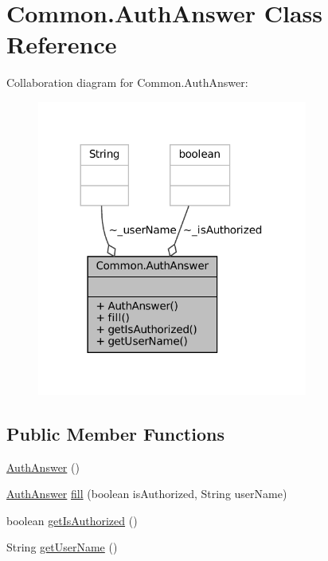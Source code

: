 \hypertarget{classCommon_1_1AuthAnswer}{}\section{Common.\+Auth\+Answer Class Reference}
\label{classCommon_1_1AuthAnswer}


Collaboration diagram for Common.\+Auth\+Answer\+:
\nopagebreak
\begin{figure}[H]
\begin{center}
\leavevmode
\includegraphics[width=252pt]{classCommon_1_1AuthAnswer__coll__graph}
\end{center}
\end{figure}
\subsection*{Public Member Functions}
\begin{DoxyCompactItemize}
\item 
\mbox{\hyperlink{classCommon_1_1AuthAnswer_ad50ba31140e0a04d1fa5e3fea5fd45bf}{Auth\+Answer}} ()
\item 
\mbox{\hyperlink{classCommon_1_1AuthAnswer}{Auth\+Answer}} \mbox{\hyperlink{classCommon_1_1AuthAnswer_a29e5a9ecc3b5d8e02c3ad157750c6594}{fill}} (boolean is\+Authorized, String user\+Name)
\item 
boolean \mbox{\hyperlink{classCommon_1_1AuthAnswer_a3e8d1c0d8a22f1674dbe041eaec8603d}{get\+Is\+Authorized}} ()
\item 
String \mbox{\hyperlink{classCommon_1_1AuthAnswer_aa175f09bf18de47d5a75cf88f675a56d}{get\+User\+Name}} ()
\end{DoxyCompactItemize}


